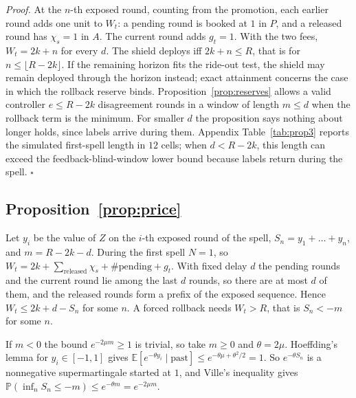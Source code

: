 \documentclass[10pt]{article}
\theoremstyle{plain}
\theoremstyle{definition}
\newcommand{\PP}{\mathbb{P}}
\newcommand{\E}{\mathbb{E}}
\begin{document}
\emph{Proof.} At the $n$-th exposed round, counting from the promotion, each earlier round adds one unit to $W_t$: a pending round is booked at $1$ in $P$, and a released round has $\chi_s=1$ in $A$. The current round adds $g_t=1$. With the two fees, $W_t=2k+n$ for every $d$. The shield deploys iff $2k+n\le R$, that is for $n\le\lfloor R-2k\rfloor$. If the remaining horizon fits the ride-out test, the shield may remain deployed through the horizon instead; exact attainment concerns the case in which the rollback reserve binds. Proposition~\ref{prop:reserves} allows a valid controller $e\le R-2k$ disagreement rounds in a window of length $m\le d$ when the rollback term is the minimum. For smaller $d$ the proposition says nothing about longer holds, since labels arrive during them. Appendix Table~\ref{tab:prop3} reports the simulated first-spell length in $12$ cells; when $d<R-2k$, this length can exceed the feedback-blind-window lower bound because labels return during the spell. $\square$

\begin{table}[!htbp]
\caption{Proposition~\ref{prop:reserves}: simulated first-spell length of the full-sampling shield on an all-harm sequence. The identity column checks that the spell equals $h=R-2k$; the rollback-branch column marks $d\ge h$, when the full feedback-blind lower bound applies. Sufficient horizon is also required. The first spell can exceed its feedback-blind portion when labels return before rollback.}\label{tab:prop3}\centering\small
\end{table}
\FloatBarrier

\subsection{Proposition~\ref{prop:price}}
Let $y_i$ be the value of $Z$ on the $i$-th exposed round of the spell, $S_n=y_1+\dots+y_n$, and $m=R-2k-d$. During the first spell $N=1$, so $W_t=2k+\sum_{\text{released}}\chi_s+\#\text{pending}+g_t$. With fixed delay $d$ the pending rounds and the current round lie among the last $d$ rounds, so there are at most $d$ of them, and the released rounds form a prefix of the exposed sequence. Hence $W_t\le2k+d-S_n$ for some $n$. A forced rollback needs $W_t>R$, that is $S_n<-m$ for some $n$.

If $m<0$ the bound $e^{-2\mu m}\ge1$ is trivial, so take $m\ge0$ and $\theta=2\mu$. Hoeffding's lemma for $y_i\in[-1,1]$ gives $\E[e^{-\theta y_i}\mid\text{past}]\le e^{-\theta\mu+\theta^2/2}=1$. So $e^{-\theta S_n}$ is a nonnegative supermartingale started at $1$, and Ville's inequality gives $\PP(\inf_nS_n\le-m)\le e^{-\theta m}=e^{-2\mu m}$.
\end{document}
